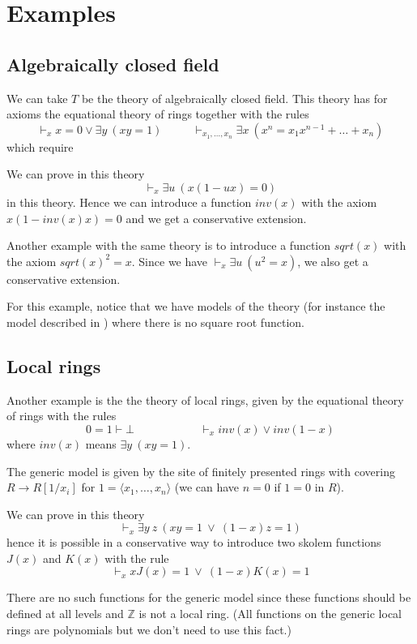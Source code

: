 \documentclass[10pt,a4paper]{article}
\newcommand{\ideal}[1]{\langle #1\rangle}
\newcommand{\ints}{\mathbb{Z}}
\begin{document}
\section{Examples}

\subsection{Algebraically closed field}

 We can take $T$ be the theory of algebraically closed field. This theory
has for axioms the equational theory of rings together with the rules
$$
\vdash_x x = 0 \vee \exists y~(xy = 1)~~~~~~~~~~~~
\vdash_{x_1,\dots,x_n} \exists x~(x^n = x_1 x^{n-1} + \dots + x_n)
$$which require

 We can prove in this theory
$$
\vdash_{x} \exists u~ (x(1-ux) = 0)
$$
in this theory. Hence we can introduce a function $inv(x)$ with the axiom
$x(1 -inv(x) x) = 0$ and we get a conservative extension. 

 Another example with the same theory is to introduce a function $sqrt(x)$ with the axiom
$sqrt(x)^2 = x$. Since we have $\vdash_{x} \exists u~(u^2 = x)$, we also get a conservative
extension.

 For this example, notice that we have models of the theory (for instance the model described
in \cite{Mannaa}) where there is no square root function.

\subsection{Local rings}

 Another example is the the theory of local rings, given by the equational theory of rings
with the rules
$$
0=1\vdash\bot~~~~~~~~~~~~~~~~~~~~~~~~~~\vdash_x inv(x)\vee inv(1-x)
$$
where $inv(x)$ means $\exists y~(xy = 1)$. 

 The generic model is given by the site of finitely presented rings with covering
$R\rightarrow R[1/x_i]$ for $1 = \ideal{x_1,\dots,x_n}$ (we can have $n = 0$ if $1=0$ in $R$).

 We can prove in this theory
$$
\vdash_x \exists y~z~(x y = 1~\vee ~(1-x) z = 1)
$$
hence it is possible in a conservative way
to introduce two skolem functions $J(x)$ and $K(x)$ with the rule
$$
\vdash_x xJ(x) = 1~\vee~(1-x)K(x) = 1
$$

 There are no such functions for the generic model since these functions should be defined
at all levels and $\ints$ is not a local ring.
(All functions on the generic local rings are polynomials but we don't need to use this fact.)
\end{document}
